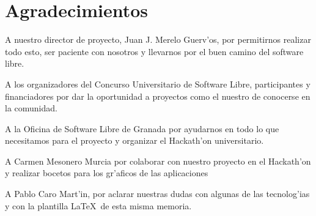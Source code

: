 \section{Agradecimientos}
\label{sec:agradecimientos}

A nuestro director de proyecto, Juan J. Merelo Guerv'os, por permitirnos realizar todo esto, ser paciente con nosotros y llevarnos por el buen camino del software libre.

A los organizadores del Concurso Universitario de Software Libre, participantes y financiadores por dar la oportunidad a proyectos como el nuestro
de conocerse en la comunidad.

A la Oficina de Software Libre de Granada por ayudarnos en todo lo que necesitamos para el proyecto y organizar el Hackath'on universitario.

A Carmen Mesonero Murcia por colaborar con nuestro proyecto en el Hackath'on y realizar bocetos para los gr'aficos de las aplicaciones

A Pablo Caro Mart'in, por aclarar nuestras dudas con algunas de las tecnolog'ias y con la plantilla \LaTeX\ de esta misma memoria.